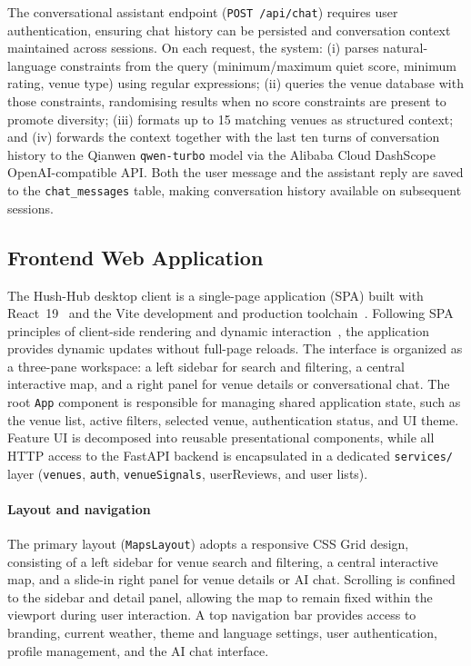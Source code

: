 \documentclass[conference]{IEEEtran}
\begin{document}
The conversational assistant endpoint (\texttt{POST /api/chat}) requires user
authentication, ensuring chat history can be persisted and conversation context
maintained across sessions. On each request, the system: (i) parses natural-language
constraints from the query (minimum/maximum quiet score, minimum rating, venue type)
using regular expressions; (ii) queries the venue database with those constraints,
randomising results when no score constraints are present to promote diversity;
(iii) formats up to 15 matching venues as structured context; and (iv) forwards the
context together with the last ten turns of conversation history to the Qianwen
\texttt{qwen-turbo} model via the Alibaba Cloud DashScope OpenAI-compatible API.
Both the user message and the assistant reply are saved to the \texttt{chat\_messages}
table, making conversation history available on subsequent sessions.

\subsection{Frontend Web Application}

The Hush-Hub desktop client is a single-page application (SPA) built with React~19~\cite{react2025} and the Vite development and production toolchain~\cite{vite2025}. Following SPA principles of client-side rendering and dynamic interaction~\cite{mikowski2014}, the application provides dynamic updates without full-page reloads. The interface is organized as a three-pane workspace: a left sidebar for search and filtering, a central interactive map, and a right panel for venue details or conversational chat. The root \texttt{App} component is responsible for managing shared application state, such as the venue list, active filters, selected venue, authentication status, and UI theme. Feature UI is decomposed into reusable presentational components, while all HTTP access to the FastAPI backend is encapsulated in a dedicated \texttt{services/} layer (\texttt{venues}, \texttt{auth}, \texttt{venueSignals}, userReviews, and user lists).

\paragraph{Layout and navigation}
The primary layout (\texttt{MapsLayout}) adopts a responsive CSS Grid design, consisting of a left sidebar for venue search and filtering, a central interactive map, and a slide-in right panel for venue details or AI chat. Scrolling is confined to the sidebar and detail panel, allowing the map to remain fixed within the viewport during user interaction. A top navigation bar provides access to branding, current weather, theme and language settings, user authentication, profile management, and the AI chat interface.
\end{document}
